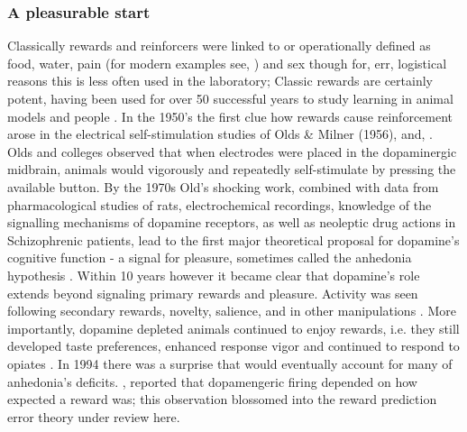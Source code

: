 \documentclass[doc,12pt]{apa}        %
\begin{document}
\subsubsection{A pleasurable start} %
\label{subsub:start}
Classically rewards and reinforcers were linked to or operationally defined as food, water, pain (for modern examples see, ) and sex though for, err, logistical reasons this is less often used in the laboratory; Classic rewards are certainly potent, having been used for over 50 successful years to study learning in animal models \cite{iversen:2007aa} and people \cite{Kim:2010p7248,Montague:2006mz}.  In the 1950's the first clue how rewards cause reinforcement arose in the electrical self-stimulation studies of Olds \& Milner (1956), and, .  Olds and colleges observed that when electrodes were placed in the dopaminergic midbrain, animals would vigorously and repeatedly self-stimulate by pressing the available button.  By the 1970s Old's shocking work, combined with data from pharmacological studies of rats, electrochemical recordings, knowledge of the signalling mechanisms of dopamine receptors, as well as neoleptic drug actions in Schizophrenic patients, lead to the first major theoretical proposal for dopamine's cognitive function - a signal for pleasure, sometimes called the anhedonia hypothesis \cite{Wise:1978p8771}.  Within 10 years however it became clear that dopamine's role extends beyond signaling primary rewards and pleasure. Activity was seen following secondary rewards, novelty, salience, and in other manipulations \cite{Spanagel:1999p8515, Salamone:2005p8774, BrombergMartin:2010p8834}.  More importantly, dopamine depleted animals continued to enjoy rewards, i.e. they still developed taste preferences, enhanced response vigor \cite{Cannon:2003p8513} and continued to respond to opiates \cite{Hnasko:2005p8832}.  In 1994 there was a surprise that would eventually account for many of anhedonia's deficits.  , reported that dopamengeric firing depended on how expected a reward was; this observation blossomed into the reward prediction error theory under review here.
\end{document}
